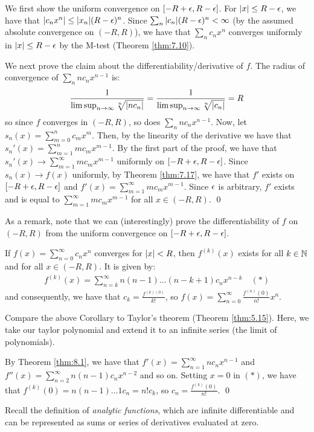 \begin{nproof}
    We first show the uniform convergence on $[-R + \epsilon, R - \epsilon]$. For $\abs{x} \leq R - \epsilon$, we have that $\abs{c_nx^n} \leq \abs{x_n}(R - \epsilon)^n$. Since $\sum_n \abs{c_n}(R - \epsilon)^n < \infty$ (by the assumed absolute convergence on $(-R, R)$), we have that $\sum_n c_nx^n$ converges uniformly in $\abs{x} \leq R - \epsilon$ by the M-test (Theorem \ref{thm:7.10}).

    We next prove the claim about the differentiability/derivative of $f$. The radius of convergence of $\sum_n nc_n x^{n-1}$ is:
    \begin{align*}
        \frac{1}{\limsup_{n \rightarrow \infty}\sqrt[n]{\abs{nc_n}}} = \frac{1}{\limsup_{n \rightarrow \infty}\sqrt[n]{\abs{c_n}}} = R
    \end{align*}
    so since $f$ converges in $(-R, R)$, so does $\sum_n nc_nx^{n-1}$. Now, let $s_n(x) = \sum_{m=0}^n c_mx^m$. Then, by the linearity of the derivative we have that $s_n'(x) = \sum_{m=1}^n mc_mx^{m-1}$. By the first part of the proof, we have that $s_n'(x) \rightarrow \sum_{m=1}^\infty mc_mx^{m-1}$ uniformly on $[-R + \epsilon, R - \epsilon]$. Since $s_n(x) \rightarrow f(x)$ uniformly, by Theorem \ref{thm:7.17}, we have that $f'$ exists on $[-R +\epsilon, R - \epsilon]$ and $f'(x) = \sum_{m=1}^\infty mc_mx^{m-1}$. Since $\epsilon$ is arbitrary, $f'$ exists and is equal to $\sum_{m=1}^\infty mc_mx^{m-1}$ for all $x \in (-R, R)$. \qed 
\end{nproof}
\noindent As a remark, note that we can (interestingly) prove the differentiability of $f$ on $(-R, R)$ from the uniform convergence on $[-R + \epsilon, R - \epsilon]$.

\begin{ncorollary}{}{}
    If $f(x) = \sum_{n=0}^\infty c_nx^n$ converges for $\abs{x} < R$, then $f^{(k)}(x)$ exists for all $k \in \mathbb{N}$ and for all $x \in (-R, R)$. It is given by:
    \begin{align*}
        f^{(k)}(x) = \sum_{n=k}^\infty n(n-1)\ldots(n-k+1)c_nx^{n-k} \quad (*)
    \end{align*}
    and consequently, we have that $c_k = \frac{f^{(k)(0)}}{k!}$, so $f(x) = \sum_{n=0}^\infty \frac{f^{(n)}(0)}{n!}x^n$.
\end{ncorollary}
\noindent Compare the above Corollary to Taylor's theorem (Theorem \ref{thm:5.15}). Here, we take our taylor polynomial and extend it to an infinite series (the limit of polynomials). 

\begin{nproof}
    By Theorem \ref{thm:8.1}, we have that $f'(x) = \sum_{n=1}^\infty nc_nx^{n-1}$ and $f''(x) = \sum_{n=2}^\infty n(n-1)c_nx^{n-2}$ and so on. Setting $x = 0$ in $(*)$, we have that $f^{(k)}(0) = n(n-1)\ldots 1 c_n = n! c_k$, so $c_n = \frac{f^{(k)}(0)}{n!}$. \qed
\end{nproof}
\noindent Recall the definition of \emph{analytic functions}, which are infinite differentiable and can be represented as sums or series of derivatives evaluated at zero. 

